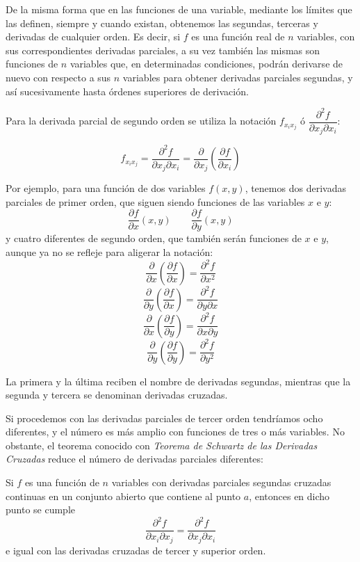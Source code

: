 De la misma forma que en las funciones de una variable, mediante los
límites que las definen, siempre y cuando existan, obtenemos las
segundas, terceras y derivadas de cualquier orden. Es decir, si $f$
es una función real de $n$ variables, con sus correspondientes
derivadas parciales, a su vez también las mismas son funciones de
$n$ variables que, en determinadas condiciones, podrán derivarse de
nuevo con respecto a sus $n$ variables para obtener derivadas
parciales segundas, y así sucesivamente hasta órdenes superiores de
derivación.

Para la derivada parcial de segundo orden se utiliza la notación
$f_{x_ix_j}$ ó $\dfrac{{\partial ^2 f}} {{\partial x_j \partial x_i
}}$:


\[
f_{x_i x_j }  = \frac{{\partial ^2 f}} {{\partial x_j \partial x_i
}} = \frac{\partial } {{\partial x_j }}\left( {\frac{{\partial f}}
{{\partial x_i }}} \right)
\]

Por ejemplo, para una función de dos variables $f(x,y)$, tenemos dos derivadas parciales de primer orden, que siguen
siendo funciones de las variables $x$ e $y$:
\[
\frac{\partial f}{\partial x}(x,y)\qquad \frac{\partial f}{\partial y}(x,y) 
\] y cuatro diferentes de segundo orden, que también serán funciones de $x$ e $y$, aunque ya no se
refleje para aligerar la notación:
\[
\frac{\partial}{\partial x}\left({\frac{\partial f}{\partial x}}\right) = \frac{\partial^2 f}{\partial x^2}
\]
\[
\frac{\partial}{\partial y}\left({\frac{\partial f}{\partial x}}\right) = \frac{\partial^2 f}{\partial y\partial x}
\]
\[
\frac{\partial}{\partial x}\left({\frac{\partial f}{\partial y}}\right) = \frac{\partial^2 f}{\partial x\partial y}
\]
\[
\frac{\partial}{\partial y}\left({\frac{\partial f}{\partial y}}\right) = \frac{\partial^2 f}{\partial y^2}
\]

La primera y la última reciben el nombre de derivadas segundas, mientras que la segunda y tercera se denominan derivadas
cruzadas.

Si procedemos con las derivadas parciales de tercer orden tendríamos ocho diferentes, y el número es más amplio con
funciones de tres o más variables.
No obstante, el teorema conocido con \emph{Teorema de Schwartz de las Derivadas Cruzadas} reduce el número de derivadas
parciales diferentes:

\begin{teorema}[Schwartz]
Si $f$ es una función de $n$ variables con derivadas parciales segundas cruzadas continuas en un conjunto abierto que
contiene al punto $a$, entonces en dicho punto se cumple
\[
\frac{\partial ^2 f}{\partial x_i \partial x_j } = \frac{\partial ^2 f}{\partial x_j \partial x_i }
\] 
e igual con las derivadas cruzadas de tercer y superior orden.
\end{teorema}

